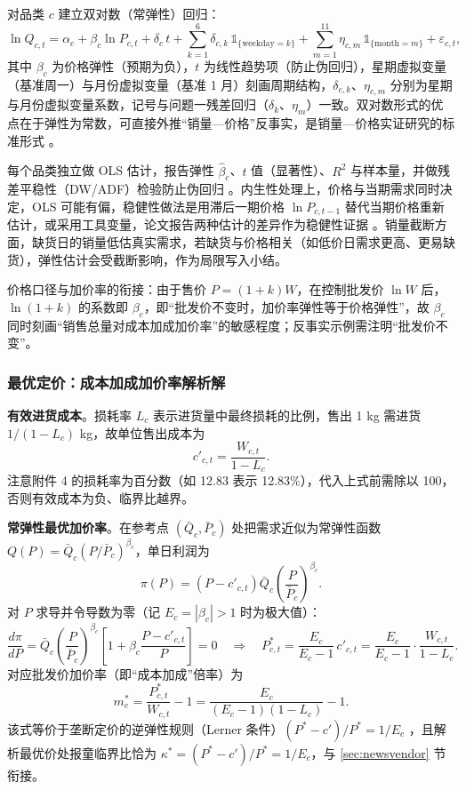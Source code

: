 对品类 $c$ 建立双对数（常弹性）回归：
\begin{equation}
\ln Q_{c,t}=\alpha_c+\beta_c\ln P_{c,t}+\delta_c\,t+\sum_{k=1}^{6}\delta_{c,k}\,\mathbb{1}_{\{\mathrm{weekday}=k\}}+\sum_{m=1}^{11}\eta_{c,m}\,\mathbb{1}_{\{\mathrm{month}=m\}}+\varepsilon_{c,t},
\end{equation}
其中 $\beta_c$ 为价格弹性（预期为负），$t$ 为线性趋势项（防止伪回归），星期虚拟变量（基准周一）与月份虚拟变量（基准 1 月）刻画周期结构，$\delta_{c,k}$、$\eta_{c,m}$ 分别为星期与月份虚拟变量系数，记号与问题一残差回归（$\delta_k$、$\eta_m$）一致。双对数形式的优点在于弹性为常数，可直接外推“销量—价格”反事实，是销量—价格实证研究的标准形式 \cite{tellis1988}。

每个品类独立做 OLS 估计，报告弹性 $\hat\beta_c$、$t$ 值（显著性）、$R^2$ 与样本量，并做残差平稳性（DW/ADF）检验防止伪回归 \cite{wooldridge2010}。内生性处理上，价格与当期需求同时决定，OLS 可能有偏，稳健性做法是用滞后一期价格 $\ln P_{c,t-1}$ 替代当期价格重新估计，或采用工具变量，论文报告两种估计的差异作为稳健性证据 \cite{wooldridge2010}。销量截断方面，缺货日的销量低估真实需求，若缺货与价格相关（如低价日需求更高、更易缺货），弹性估计会受截断影响，作为局限写入小结。

价格口径与加价率的衔接：由于售价 $P=(1+k)W$，在控制批发价 $\ln W$ 后，$\ln(1+k)$ 的系数即 $\beta_c$，即“批发价不变时，加价率弹性等于价格弹性”，故 $\beta_c$ 同时刻画“销售总量对成本加成加价率”的敏感程度；反事实示例需注明“批发价不变”。

\subsubsection{最优定价：成本加成加价率解析解}

\textbf{有效进货成本}。损耗率 $L_c$ 表示进货量中最终损耗的比例，售出 1 kg 需进货 $1/(1-L_c)$ kg，故单位售出成本为 \cite{nahmias1982,blackburn2009,tang2018}
\begin{equation}
c'_{c,t}=\frac{W_{c,t}}{1-L_c}.
\end{equation}
注意附件 4 的损耗率为百分数（如 12.83 表示 12.83\%），代入上式前需除以 100，否则有效成本为负、临界比越界。

\textbf{常弹性最优加价率}。在参考点 $(\bar Q_c,\bar P_c)$ 处把需求近似为常弹性函数 $Q(P)=\bar Q_c(P/\bar P_c)^{\beta_c}$，单日利润为 \cite{petruzzi1999}
\begin{equation}
\pi(P)=\left(P-c'_{c,t}\right)\bar Q_c\left(\frac{P}{\bar P_c}\right)^{\beta_c}.
\end{equation}
对 $P$ 求导并令导数为零（记 $E_c=|\beta_c|>1$ 时为极大值）：
\begin{equation}
\frac{d\pi}{dP}=\bar Q_c\left(\frac{P}{\bar P_c}\right)^{\beta_c}\left[1+\beta_c\frac{P-c'_{c,t}}{P}\right]=0 \quad\Longrightarrow\quad P^*_{c,t}=\frac{E_c}{E_c-1}\,c'_{c,t}=\frac{E_c}{E_c-1}\cdot\frac{W_{c,t}}{1-L_c}.
\end{equation}
对应批发价加价率（即“成本加成”倍率）为
\begin{equation}
m^*_c=\frac{P^*_{c,t}}{W_{c,t}}-1=\frac{E_c}{(E_c-1)(1-L_c)}-1.
\end{equation}
该式等价于垄断定价的逆弹性规则（Lerner 条件）$(P^*-c')/P^*=1/E_c$ \cite{mascolel1995}，且解析最优价处报童临界比恰为 $\kappa^*=(P^*-c')/P^*=1/E_c$，与 \ref{sec:newsvendor} 节衔接。

